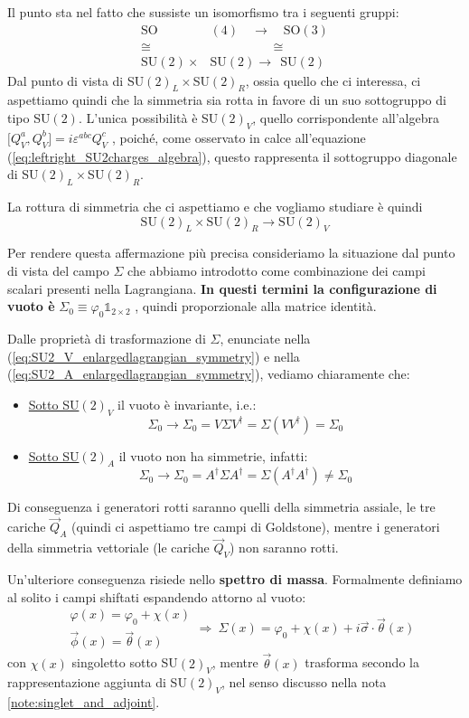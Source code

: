\documentclass[../main.tex]{subfiles}
\begin{document}
Il punto sta nel fatto che sussiste un isomorfismo tra i seguenti gruppi:
\begin{align*}
    \text{SO}&(4) \quad\rightarrow\quad\text{SO}(3)\\
    \cong& \quad\quad\quad\quad\quad \cong \\
    \text{SU}(2)\times&\text{SU}(2)\rightarrow~~\text{SU}(2)
\end{align*}
Dal punto di vista di SU$(2)_L\times$SU$(2)_R$, ossia quello che ci interessa, ci aspettiamo quindi che la simmetria sia rotta in favore di un suo sottogruppo di tipo SU$(2)$. L'unica possibilità è SU$(2)_V$, quello corrispondente all'algebra \(\big[{Q}^a_V,{Q}^b_V\big] = i\varepsilon^{abc}Q^c_V\) , poiché, come osservato in calce all'equazione (\ref{eq:leftright_SU2charges_algebra}), questo rappresenta il sottogruppo diagonale di SU$(2)_L\times$SU$(2)_R$.

La rottura di simmetria che ci aspettiamo e che vogliamo studiare è quindi
\[
\boxed{\text{SU}(2)_L\times\text{SU}(2)_R \rightarrow \text{SU}(2)_V}
\]

Per rendere questa affermazione più precisa consideriamo la situazione dal punto di vista del campo $\Sigma$ che abbiamo introdotto come combinazione dei campi scalari presenti nella Lagrangiana. \textbf{In questi termini la configurazione di vuoto è} $\boxed{\Sigma_0 \equiv \varphi_0\mathbb1_{2\times2}}$ , quindi proporzionale alla matrice identità.

Dalle proprietà di trasformazione di $\Sigma$, enunciate nella (\ref{eq:SU2_V_enlargedlagrangian_symmetry}) e nella (\ref{eq:SU2_A_enlargedlagrangian_symmetry}), vediamo chiaramente che:
\begin{itemize}
    \item \underline{Sotto SU$(2)_V$} il vuoto è invariante, i.e.:
    \[
    \Sigma_0\rightarrow\Sigma_0 = V\Sigma V^\dagger = \Sigma (VV^\dagger) = \Sigma_0
    \]
    \item \underline{Sotto SU$(2)_A$} il vuoto non ha simmetrie, infatti:
    \[
    \Sigma_0\rightarrow\Sigma_0 = A^\dagger\Sigma A^\dagger = \Sigma (A^\dagger A^\dagger) \neq \Sigma_0
    \]
\end{itemize}

Di conseguenza i generatori rotti saranno quelli della simmetria assiale, le tre cariche $\Vec{Q}_A$ (quindi ci aspettiamo tre campi di Goldstone), mentre i generatori della simmetria vettoriale (le cariche $\Vec{Q}_V$) non saranno rotti.

Un'ulteriore conseguenza risiede nello \textbf{spettro di massa}. Formalmente definiamo al solito i campi shiftati espandendo attorno al vuoto:
\[
\begin{aligned}
    &\varphi(x) = \varphi_0 + \chi(x)  \\
    &\Vec\phi(x) = \Vec\theta(x)     
\end{aligned}
\Rightarrow ~{\Sigma(x) = \varphi_0 + \chi(x) +i \Vec\sigma\cdot\Vec\theta(x)} 
\]
con $\chi(x)$ singoletto sotto SU$(2)_V$, mentre $\Vec\theta(x)$ trasforma secondo la rappresentazione aggiunta di SU$(2)_V$, nel senso discusso nella nota \ref{note:singlet_and_adjoint}.
\end{document}
